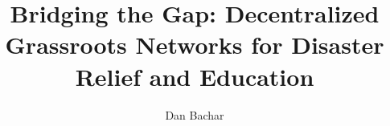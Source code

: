\usepackage[utf8]{inputenc}
\usepackage{packages}
\usepackage{beamermods}
\usepackage{adjustbox}
\usepackage{attachfile}

\author[D. Bachar]{Dan Bachar}
\title[BridgeTheGap]{Bridging the Gap: Decentralized Grassroots Networks for Disaster Relief and Education}


\usepackage{pgfpages}
\usepackage{ifthen}
\newif\ifsolution%

\makeatletter
\let\@@magyar@captionfix\relax
\makeatother

